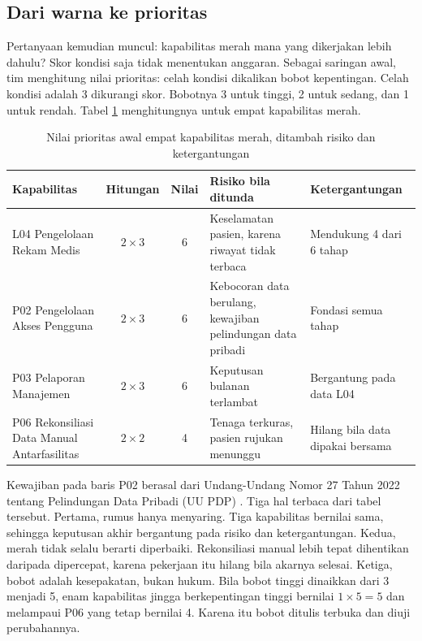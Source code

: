 \subsection*{Dari warna ke prioritas}

Pertanyaan kemudian muncul: kapabilitas merah mana yang dikerjakan lebih dahulu? Skor kondisi saja tidak
menentukan anggaran. Sebagai saringan awal, tim menghitung nilai prioritas: celah kondisi dikalikan bobot
kepentingan. Celah kondisi adalah 3 dikurangi skor. Bobotnya 3 untuk tinggi, 2 untuk sedang, dan 1 untuk
rendah. Tabel \ref{tab:ch05-prioritas} menghitungnya untuk empat kapabilitas merah.

\begin{table}[!htb]
  \centering
  \caption{Nilai prioritas awal empat kapabilitas merah, ditambah risiko dan ketergantungan}
  \label{tab:ch05-prioritas}
  \small
  \begin{tabularx}{\textwidth}{>{\raggedright\arraybackslash}p{2.8cm}cc>{\raggedright\arraybackslash}X>{\raggedright\arraybackslash}X}
    \hline
    \textbf{Kapabilitas} & \textbf{Hitungan} & \textbf{Nilai} & \textbf{Risiko bila ditunda} & \textbf{Ketergantungan} \\
    \hline
    L04 Pengelolaan Rekam Medis & $2 \times 3$ & 6 & Keselamatan pasien, karena riwayat tidak terbaca & Mendukung 4 dari 6 tahap \\
    \hline
    P02 Pengelolaan Akses Pengguna & $2 \times 3$ & 6 & Kebocoran data berulang, kewajiban pelindungan data pribadi & Fondasi semua tahap \\
    \hline
    P03 Pelaporan Manajemen & $2 \times 3$ & 6 & Keputusan bulanan terlambat & Bergantung pada data L04 \\
    \hline
    P06 Rekonsiliasi Data Manual Antarfasilitas & $2 \times 2$ & 4 & Tenaga terkuras, pasien rujukan menunggu & Hilang bila data dipakai bersama \\
    \hline
  \end{tabularx}
\end{table}

Kewajiban pada baris P02 berasal dari Undang-Undang Nomor 27 Tahun 2022 tentang Pelindungan Data Pribadi
(UU PDP) \cite{uu27-2022-pdp}. Tiga hal terbaca dari tabel tersebut. Pertama, rumus hanya menyaring. Tiga
kapabilitas bernilai sama, sehingga keputusan akhir bergantung pada risiko dan ketergantungan. Kedua, merah tidak selalu
berarti diperbaiki. Rekonsiliasi manual lebih tepat dihentikan daripada dipercepat, karena pekerjaan itu hilang
bila akarnya selesai. Ketiga, bobot adalah kesepakatan, bukan hukum. Bila bobot tinggi dinaikkan dari 3 menjadi
5, enam kapabilitas jingga berkepentingan tinggi bernilai $1 \times 5 = 5$ dan melampaui P06 yang tetap bernilai
4. Karena itu bobot ditulis terbuka dan diuji perubahannya.

